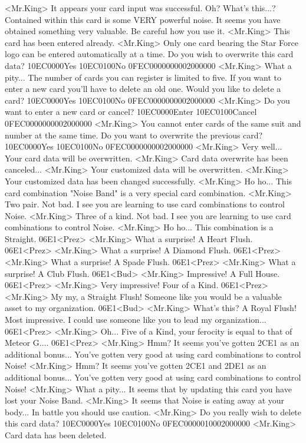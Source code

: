 <Mr.King> It appears your card input was successful. 
Oh? What's this...? 
Contained within this card is some VERY powerful noise. 
It seems you have obtained something very valuable. 
Be careful how you use it. 
<Mr.King> This card has been entered already. 
<Mr.King> Only one card bearing the Star Force logo can be 
entered automatically at a time. 
Do you wish to overwrite this card data? 
{10}{EC}{00}{00}Yes {10}{EC}{01}{00}No {0F}{EC}{00}{00}{00}{00}{02}{00}{00}{00}
<Mr.King> What a pity... The number of cards you can register is limited to five. 
If you want to enter a new card you'll have to delete an old one. 
Would you like to delete a card? 
{10}{EC}{00}{00}Yes {10}{EC}{01}{00}No {0F}{EC}{00}{00}{00}{00}{02}{00}{00}{00}
<Mr.King> Do you want to enter a new card or cancel? {10}{EC}{00}{00}Enter {10}{EC}{01}{00}Cancel {0F}{EC}{00}{00}{00}{00}{02}{00}{00}{00}
<Mr.King> You cannot enter cards of the same suit and number at the same time. 
Do you want to overwrite the previous card? 
{10}{EC}{00}{00}Yes {10}{EC}{01}{00}No {0F}{EC}{00}{00}{00}{00}{02}{00}{00}{00}
<Mr.King> Very well... Your card data will be overwritten. 
<Mr.King> Card data overwrite has been canceled... 
<Mr.King> Your customized data will be overwritten. 
<Mr.King> Your customized data has been changed successfully. 
<Mr.King> Ho ho... This card combination "Noise Band" is a very 
special card combination. 
<Mr.King> Two pair. Not bad. I see you are learning to use 
card combinations to control Noise. 
<Mr.King> Three of a kind. Not bad. I see you are learning to 
use card combinations to control Noise. 
<Mr.King> Ho ho... This combination is a Straight. 
{06}{E1}<Prez>
<Mr.King> What a surprise! A Heart Flush. 
{06}{E1}<Prez>
<Mr.King> What a surprise! A Diamond Flush. 
{06}{E1}<Prez>
<Mr.King> What a surprise! A Spade Flush. 
{06}{E1}<Prez>
<Mr.King> What a surprise! A Club Flush. 
{06}{E1}<Bud>
<Mr.King> Impressive! A Full House. 
{06}{E1}<Prez>
<Mr.King> Very impressive! Four of a Kind. 
{06}{E1}<Prez>
<Mr.King> My my, a Straight Flush! Someone like you would be 
a valuable asset to my organization. 
{06}{E1}<Bud>
<Mr.King> What's this? A Royal Flush! Most impressive. 
I could use someone like you to lead my organization... 
{06}{E1}<Prez>
<Mr.King> Oh... Five of a Kind, your ferocity is equal to that of Meteor G.... 
{06}{E1}<Prez>
<Mr.King> Hmm? It seems you've gotten {2C}{E1} as an additional bonus... 
You've gotten very good at using card combinations to control Noise! 
<Mr.King> Hmm? It seems you've gotten {2C}{E1} and {2D}{E1}  as an additional bonus... 
You've gotten very good at using card combinations to control Noise! 
<Mr.King> What a pity... It seems that by updating this 
card you have lost your Noise Band. 
<Mr.King> It seems that Noise is eating away at your body... 
In battle you should use caution. 
<Mr.King> Do you really wish to delete this card data? {10}{EC}{00}{00}Yes {10}{EC}{01}{00}No {0F}{EC}{00}{00}{01}{00}{02}{00}{00}{00}
<Mr.King> Card data has been deleted. 
